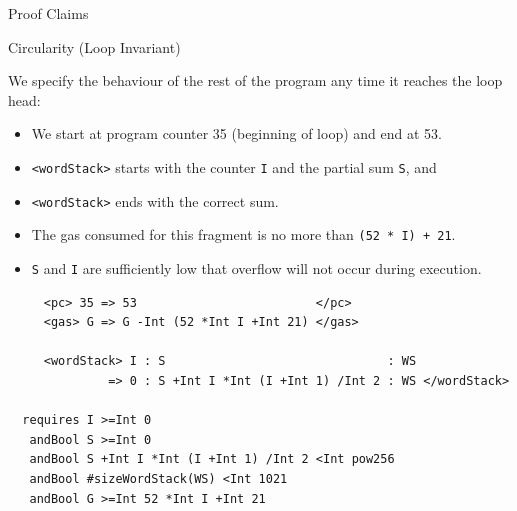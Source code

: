 \documentclass[8pt,ignorenonframetext,]{beamer}
\providecommand{\tightlist}{%
  \setlength{\itemsep}{0pt}\setlength{\parskip}{0pt}}
\begin{document}
\begin{frame}[fragile]{Proof Claims}

\pause

\begin{block}{Circularity (Loop Invariant)}

We specify the behaviour of the rest of the program any time it reaches
the loop head:

\begin{itemize}
\tightlist
\item
  We start at program counter 35 (beginning of loop) and end at 53.
\item
  \texttt{\textless{}wordStack\textgreater{}} starts with the counter
  \texttt{I} and the partial sum \texttt{S}, and
\item
  \texttt{\textless{}wordStack\textgreater{}} ends with the correct sum.
\item
  The gas consumed for this fragment is no more than
  \texttt{(52\ *\ I)\ +\ 21}.
\item
  \texttt{S} and \texttt{I} are sufficiently low that overflow will not
  occur during execution.
\end{itemize}

\pause

\begin{verbatim}
     <pc> 35 => 53                         </pc>
     <gas> G => G -Int (52 *Int I +Int 21) </gas>

     <wordStack> I : S                               : WS
              => 0 : S +Int I *Int (I +Int 1) /Int 2 : WS </wordStack>

  requires I >=Int 0
   andBool S >=Int 0
   andBool S +Int I *Int (I +Int 1) /Int 2 <Int pow256
   andBool #sizeWordStack(WS) <Int 1021
   andBool G >=Int 52 *Int I +Int 21
\end{verbatim}

\end{block}

\end{frame}
\end{document}
